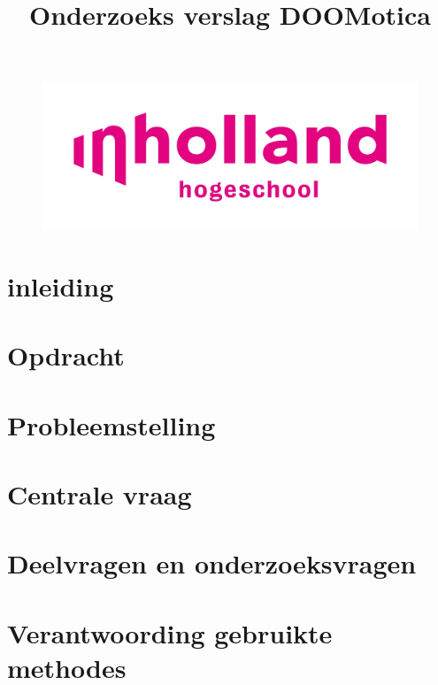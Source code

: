 \documentclass[11pt]{article}
\title{Onderzoeks verslag DOOMotica}
\begin{document}
	\maketitle %
	\begin{figure}[h]
		\centering
		\includegraphics[width=\textwidth]{inholland}
	\end{figure}

	\newpage
	
	\tableofcontents
	\newpage
	\section{inleiding}
	
	\newpage
	
	\section{Opdracht}
	
	\newpage
	
	\section{Probleemstelling}
	
	\newpage
	
	\section{Centrale vraag}
	
	\newpage
	
	\section{Deelvragen en onderzoeksvragen}
	
	\newpage
	
	\section{Verantwoording gebruikte methodes}
	
\end{document}
